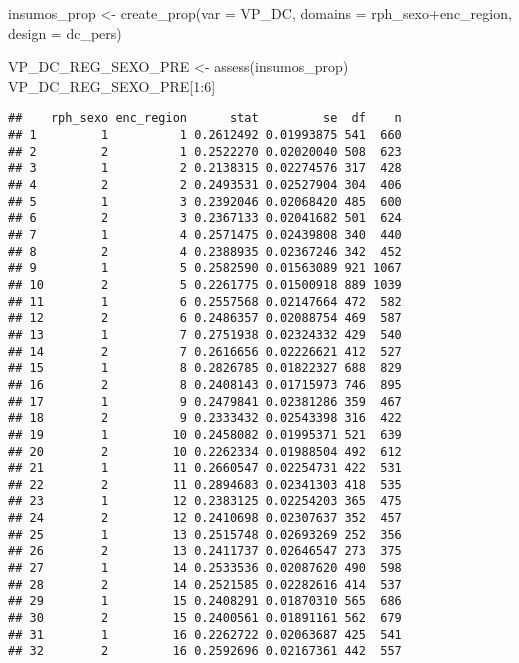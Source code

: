 \documentclass[
]{book}
\newenvironment{Shaded}{\begin{snugshade}}{\end{snugshade}}
\newcommand{\AttributeTok}[1]{\textcolor[rgb]{0.77,0.63,0.00}{#1}}
\newcommand{\DecValTok}[1]{\textcolor[rgb]{0.00,0.00,0.81}{#1}}
\newcommand{\FunctionTok}[1]{\textcolor[rgb]{0.00,0.00,0.00}{#1}}
\newcommand{\NormalTok}[1]{#1}
\newcommand{\OtherTok}[1]{\textcolor[rgb]{0.56,0.35,0.01}{#1}}
\newcommand{\SpecialCharTok}[1]{\textcolor[rgb]{0.00,0.00,0.00}{#1}}
\newcommand{\StringTok}[1]{\textcolor[rgb]{0.31,0.60,0.02}{#1}}
\theoremstyle{definition}
\theoremstyle{definition}
\theoremstyle{definition}
\theoremstyle{definition}
\theoremstyle{remark}
\begin{document}
\begin{Shaded}
\begin{Highlighting}[]
\NormalTok{insumos\_prop }\OtherTok{\textless{}{-}} \FunctionTok{create\_prop}\NormalTok{(}\AttributeTok{var =} \StringTok{\textquotesingle{}VP\_DC\textquotesingle{}}\NormalTok{, }
                                   \AttributeTok{domains =} \StringTok{\textquotesingle{}rph\_sexo+enc\_region\textquotesingle{}}\NormalTok{, }
                                   \AttributeTok{design =}\NormalTok{  dc\_pers)}

\NormalTok{VP\_DC\_REG\_SEXO\_PRE }\OtherTok{\textless{}{-}} \FunctionTok{assess}\NormalTok{(insumos\_prop)}
\NormalTok{VP\_DC\_REG\_SEXO\_PRE[}\DecValTok{1}\SpecialCharTok{:}\DecValTok{6}\NormalTok{]}
\end{Highlighting}
\end{Shaded}

\begin{verbatim}
##    rph_sexo enc_region      stat         se  df    n
## 1         1          1 0.2612492 0.01993875 541  660
## 2         2          1 0.2522270 0.02020040 508  623
## 3         1          2 0.2138315 0.02274576 317  428
## 4         2          2 0.2493531 0.02527904 304  406
## 5         1          3 0.2392046 0.02068420 485  600
## 6         2          3 0.2367133 0.02041682 501  624
## 7         1          4 0.2571475 0.02439808 340  440
## 8         2          4 0.2388935 0.02367246 342  452
## 9         1          5 0.2582590 0.01563089 921 1067
## 10        2          5 0.2261775 0.01500918 889 1039
## 11        1          6 0.2557568 0.02147664 472  582
## 12        2          6 0.2486357 0.02088754 469  587
## 13        1          7 0.2751938 0.02324332 429  540
## 14        2          7 0.2616656 0.02226621 412  527
## 15        1          8 0.2826785 0.01822327 688  829
## 16        2          8 0.2408143 0.01715973 746  895
## 17        1          9 0.2479841 0.02381286 359  467
## 18        2          9 0.2333432 0.02543398 316  422
## 19        1         10 0.2458082 0.01995371 521  639
## 20        2         10 0.2262334 0.01988504 492  612
## 21        1         11 0.2660547 0.02254731 422  531
## 22        2         11 0.2894683 0.02341303 418  535
## 23        1         12 0.2383125 0.02254203 365  475
## 24        2         12 0.2410698 0.02307637 352  457
## 25        1         13 0.2515748 0.02693269 252  356
## 26        2         13 0.2411737 0.02646547 273  375
## 27        1         14 0.2533536 0.02087620 490  598
## 28        2         14 0.2521585 0.02282616 414  537
## 29        1         15 0.2408291 0.01870310 565  686
## 30        2         15 0.2400561 0.01891161 562  679
## 31        1         16 0.2262722 0.02063687 425  541
## 32        2         16 0.2592696 0.02167361 442  557
\end{verbatim}
\end{document}
